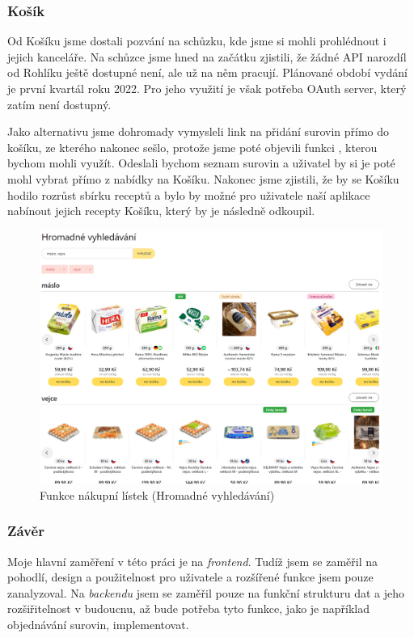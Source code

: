\subsubsection{Košík}
Od Košíku jsme dostali pozvání na schůzku, kde jsme si mohli prohlédnout i jejich kanceláře. Na schůzce jsme hned na začátku
zjistili, že žádné API narozdíl od Rohlíku ještě dostupné není, ale už na něm pracují. Plánované období vydání je
první kvartál roku 2022. Pro jeho využití je však potřeba OAuth server, který zatím není dostupný.

Jako alternativu jsme dohromady vymysleli link na přidání surovin přímo do košíku, ze kterého nakonec sešlo, protože jsme
poté objevili funkci , kterou bychom mohli využít. Odeslali bychom seznam surovin a uživatel by si je poté
mohl vybrat přímo z nabídky na Košíku. Nakonec jsme zjistili, že by se Košíku hodilo rozrůst sbírku receptů a bylo by možné
pro uživatele naší aplikace nabínout jejich recepty Košíku, který by je následně odkoupil.

\begin{figure}[H]
    \includegraphics[width=\textwidth]{images/kosik-nakupni-listek}
    \caption{Funkce nákupní lístek (Hromadné vyhledávání)} \label{picture:kosik:nakupni-listek}
\end{figure}

\subsubsection{Závěr}
Moje hlavní zaměření v této práci je na \emph{frontend}. Tudíž jsem se zaměřil na pohodlí, design a použitelnost pro uživatele
a rozšířené funkce jsem pouze zanalyzoval. Na \emph{backendu} jsem se zaměřil pouze na funkční strukturu dat a jeho rozšiřitelnost
v budoucnu, až bude potřeba tyto funkce, jako je například objednávání surovin, implementovat.

